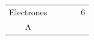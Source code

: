 \begin{exerciseEVAU}
\begin{table}[H]
\begin{tabular}{@{}cp{1.5cm}p{1.5cm}p{1.5cm}p{1.5cm}@{}}
            Electrones &  &  & \centering & 6 \\[3pt]
            A &  &  & \centering 31 &  \\
            \bottomrule
        \end{tabular}
        \label{tab:}
    \end{table}

\end{exerciseEVAU}
